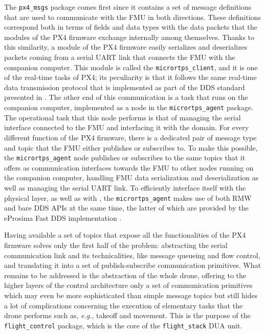 The \texttt{px4\_msgs} package comes first since it contains a set of message definitions that are used to communicate with the FMU in both directions. These definitions correspond both in terms of fields and data types with the data packets that the modules of the PX4 firmware exchange internally among themselves. Thanks to this similarity, a module of the PX4 firmware easily serializes and deserializes packets coming from a serial UART link that connects the FMU with the companion computer. This module is called the \texttt{micrortps\_client}, and it is one of the real-time tasks of PX4; its peculiarity is that it follows the same real-time data transmission protocol that is implemented as part of the DDS standard presented in . The other end of this communication is a task that runs on the companion computer, implemented as a \ROS node in the \texttt{micrortps\_agent} package. The operational task that this node performs is that of managing the serial interface connected to the FMU and interfacing it with the \ROS domain. For every different function of the PX4 firmware, there is a dedicated pair of message type and \ROS topic that the FMU either publishes or subscribes to. To make this possible, the \texttt{micrortps\_agent} node publishes or subscribes to the same \ROS topics that it offers as communication interfaces towards the FMU to other \ROS nodes running on the companion computer, handling FMU data serialization and deserialization as well as managing the serial UART link. To efficiently interface itself with the physical layer, as well as with \ROS, the \texttt{micrortps\_agent} makes use of both \ROS RMW and bare DDS APIs at the same time, the latter of which are provided by the eProsima Fast DDS implementation \cite{eprosima_fast_nodate}.

Having available a set of \ROS topics that expose all the functionalities of the PX4 firmware solves only the first half of the problem: abstracting the serial communication link and its technicalities, like message queueing and flow control, and translating it into a set of publish-subscribe communication primitives. What remains to be addressed is the abstraction of the whole drone, offering to the higher layers of the control architecture only a set of communication primitives which may even be more sophisticated than simple message topics but still hides a lot of complications concerning the execution of elementary tasks that the drone performs such as, \emph{e.g.}, takeoff and movement. This is the purpose of the \texttt{flight\_control} package, which is the core of the \texttt{flight\_stack} DUA unit.

